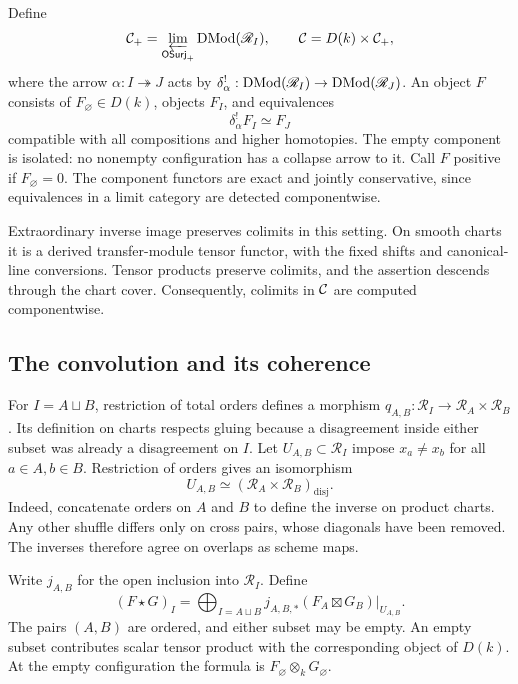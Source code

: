 Define
\begin{equation}\label{ogd:eq:category}
 \mathcal C_+=\varprojlim_{\mathsf{OSurj}_+}\operatorname{DMod}(\mathscr R_I),
 \qquad
 \mathcal C=D(k)\times\mathcal C_+,
\end{equation}
where the arrow \(\alpha:I\twoheadrightarrow J\) acts by
\(\delta_\alpha^!:\operatorname{DMod}(\mathscr R_I)\to\operatorname{DMod}(\mathscr R_J)\).
An object \(F\) consists of \(F_\varnothing\in D(k)\), objects \(F_I\), and equivalences
\[
 \delta_\alpha^!F_I\simeq F_J
\]
compatible with all compositions and higher homotopies.
The empty component is isolated: no nonempty configuration has a collapse arrow to it.
Call \(F\) positive if \(F_\varnothing=0\).
The component functors are exact and jointly conservative, since equivalences in a limit category are detected componentwise.

Extraordinary inverse image preserves colimits in this setting.
On smooth charts it is a derived transfer-module tensor functor, with the fixed shifts and canonical-line conversions.
Tensor products preserve colimits, and the assertion descends through the chart cover.
Consequently, colimits in \(\mathcal C\) are computed componentwise.

\subsection{The convolution and its coherence}

For \(I=A\sqcup B\), restriction of total orders defines a morphism
\(q_{A,B}:\mathscr R_I\to \mathscr R_A\times \mathscr R_B\).
Its definition on charts respects gluing because a disagreement inside either subset was already a disagreement on \(I\).
Let \(U_{A,B}\subset \mathscr R_I\) impose \(x_a\ne x_b\) for all \(a\in A,b\in B\).
Restriction of orders gives an isomorphism
\begin{equation}\label{ogd:eq:disjoint-open}
 U_{A,B}\simeq(\mathscr R_A\times \mathscr R_B)_{\mathrm{disj}}.
\end{equation}
Indeed, concatenate orders on \(A\) and \(B\) to define the inverse on product charts.
Any other shuffle differs only on cross pairs, whose diagonals have been removed.
The inverses therefore agree on overlaps as scheme maps.

Write\label{ogd:def:atlas-disjoint-open-inclusion} \(j_{A,B}\) for the open inclusion into \(\mathscr R_I\).
Define
\begin{equation}\label{ogd:eq:convolution}
 (F\star G)_I=
 \bigoplus_{I=A\sqcup B}
 j_{A,B,*}(F_A\boxtimes G_B)|_{U_{A,B}}.
\end{equation}
The pairs \((A,B)\) are ordered, and either subset may be empty.
An empty subset contributes scalar tensor product with the corresponding object of \(D(k)\).
At the empty configuration the formula is \(F_\varnothing\otimes_kG_\varnothing\).

